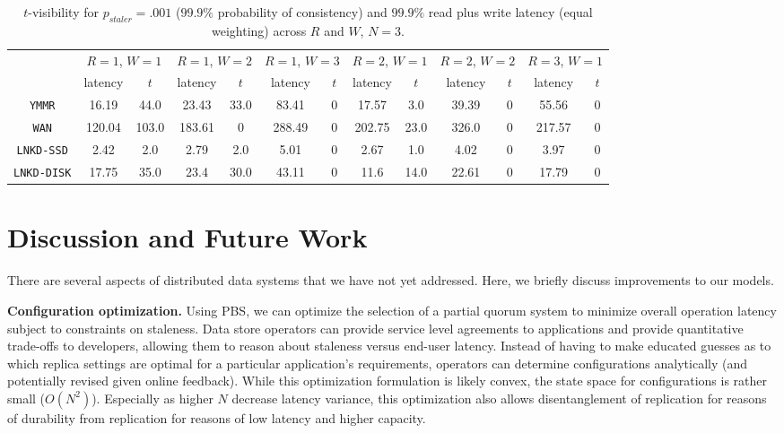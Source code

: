 \documentclass{vldb}
\begin{document}
\begin{table}
\begin{center}
\begin{tabular}{c|c|c|c|c|c|c|c|c|c|c|c|c|}
\cline{2-13}
& \multicolumn{2}{|c|}{$R$$=$$1$, $W$$=$$1$} & \multicolumn{2}{|c|}{$R$$=$$1$, $W$$=$$2$} & \multicolumn{2}{|c|}{$R$$=$$1$, $W$$=$$3$} & \multicolumn{2}{|c|}{$R$$=$$2$, $W$$=$$1$} & \multicolumn{2}{|c|}{$R$$=$$2$, $W$$=$$2$} & \multicolumn{2}{|c|}{$R$$=$$3$, $W$$=$$1$}  \\
&\multicolumn{1}{|c}{latency} & \multicolumn{1}{c|}{$t$} &  \multicolumn{1}{|c}{latency} & \multicolumn{1}{c|}{$t$} &  \multicolumn{1}{|c}{latency} & \multicolumn{1}{c|}{$t$} &  \multicolumn{1}{|c}{latency} & \multicolumn{1}{c|}{$t$} &  \multicolumn{1}{|c}{latency} & \multicolumn{1}{c|}{$t$} &  \multicolumn{1}{|c}{latency} & \multicolumn{1}{c|}{$t$}   \\ \hline
\multicolumn{1}{|c|}{\texttt{YMMR}} & 
16.19 & 44.0 & 23.43 & 33.0 & 83.41 & 0 & 17.57 & 3.0 & 39.39 & 0 & 55.56 & 0  \\
\multicolumn{1}{|c|}{\texttt{WAN}} & 
120.04 & 103.0 & 183.61 & 0 & 288.49 & 0 & 202.75 & 23.0 & 326.0 & 0 & 217.57 & 0 \\
\multicolumn{1}{|c|}{\texttt{LNKD-SSD}} & 
2.42 & 2.0 & 2.79 & 2.0 & 5.01 & 0 & 2.67 & 1.0 & 4.02 & 0 & 3.97 & 0  \\
\multicolumn{1}{|c|}{\texttt{LNKD-DISK}} & 
17.75 & 35.0 & 23.4 & 30.0 & 43.11 & 0 & 11.6 & 14.0 & 22.61 & 0 & 17.79 & 0  \\
\hline
\end{tabular}
\caption{$t$-visibility for $p_{staler} = .001$ ($99.9\%$ probability of consistency) and $99.9\%$ read plus write latency (equal weighting) across $R$ and $W$, $N$$=$$3$.}
\label{table:lat-stale}
\end{center}
\end{table}


\section{Discussion and Future Work}
\label{sec:discussion}

There are several aspects of distributed data systems that we have not yet
addressed.  Here, we briefly discuss improvements to our models.

\textbf{Configuration optimization.} Using PBS, we can optimize the
selection of a partial quorum system to minimize overall operation
latency subject to constraints on staleness.  Data store operators can
provide service level agreements to applications and provide
quantitative trade-offs to developers, allowing them to reason about
staleness versus end-user latency.  Instead of having to make educated
guesses as to which replica settings are optimal for a particular
application's requirements, operators can determine configurations
analytically (and potentially revised given online feedback).  While
this optimization formulation is likely convex, the state space for
configurations is rather small ($O(N^2)$).  Especially as higher $N$
decrease latency variance, this optimization also allows
disentanglement of replication for reasons of durability from
replication for reasons of low latency and higher capacity.
\end{document}
